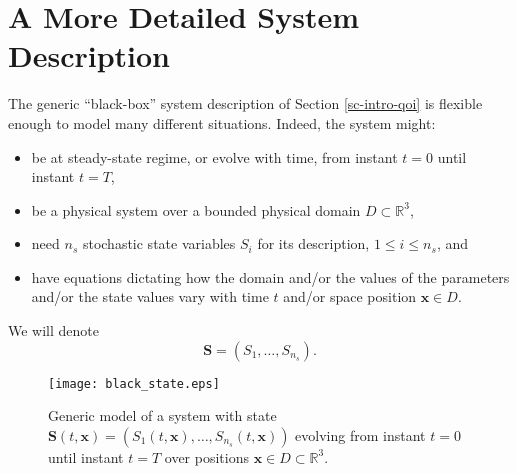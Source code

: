 \section{A More Detailed System Description}\label{sc-intro-detail}

The generic ``black-box'' system description of Section \ref{sc-intro-qoi} is flexible enough to model many different situations. Indeed, the system might:
\begin{itemize}
\item be at steady-state regime, or evolve with time, from instant $t=0$ until instant $t=T$,
\item be a physical system over a bounded physical domain $D\subset\mathbb{R}^3$,
\item need $n_{s}$ stochastic state variables $S_i$ for its description, $1\leqslant i\leqslant n_s$, and
\item have equations dictating how the domain and/or the values of the parameters and/or the state values vary with time $t$ and/or space position $\mathbf{x}\in D$.
\end{itemize}
We will denote
\begin{equation*}
\mathbf{S} = (S_1,\ldots,S_{n_s}).
\end{equation*}

\begin{figure}%
\begin{center}
\texttt{[image: black\_state.eps]}
\end{center}
\caption{Generic model of a system with state $\mathbf{S}(t,\mathbf{x}) = (S_1(t,\mathbf{x}),\ldots,S_{n_s}(t,\mathbf{x}))$
evolving from instant $t=0$ until instant $t=T$
over positions $\mathbf{x}\in D\subset\mathbb{R}^3$.
}
\label{fig-state-model}
\end{figure}
